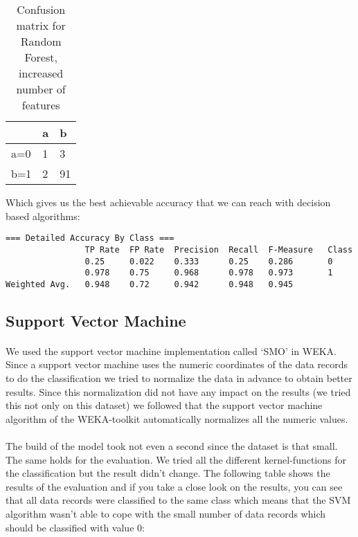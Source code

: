 \documentclass[paper=a4, fontsize=11pt]{scrartcl} %
\numberwithin{equation}{section} %
\numberwithin{figure}{section} %
\numberwithin{table}{section} %
\begin{document}
\begin{table}[h]
\centering
\begin{tabular}{|l|ll|}
\hline
 & a &	b \\
\hline
a=0 & 1 & 3 \\
b=1 & 2 & 91\\
\hline
\end{tabular}
\caption{Confusion matrix for Random Forest, increased number of features}
\end{table}

Which gives us the best achievable accuracy that we can reach with decision based algorithms:
\begin{lstlisting}
=== Detailed Accuracy By Class ===
                TP Rate  FP Rate  Precision  Recall  F-Measure   Class
                0.25     0.022    0.333      0.25    0.286       0
                0.978    0.75     0.968      0.978   0.973       1
Weighted Avg.   0.948    0.72     0.942      0.948   0.945      
\end{lstlisting}

\subsection{Support Vector Machine}

\paragraph{}We used the support vector machine implementation called `SMO' in WEKA. Since a support vector machine uses the numeric coordinates of the data records to do the classification we tried to normalize the data in advance to obtain better results. Since this normalization did not have any impact on the results (we tried this not only on this dataset) we followed that the support vector machine algorithm of the WEKA-toolkit automatically normalizes all the numeric values.

\paragraph{}The build of the model took not even a second since the dataset is that small. The same holds for the evaluation. We tried all the different kernel-functions for the classification but the result didn't change. The following table shows the results of the evaluation and if you take a close look on the results, you can see that all data records were classified to the same class which means that the SVM algorithm wasn't able to cope with the small number of data records which should be classified with value 0:
\end{document}
